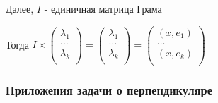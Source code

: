 \documentclass[12pt]{article}
\begin{document}
    \smallvspace

    Далее, $I$ - единичная матрица Грама

    \Nota Тогда $I \times \begin{pmatrix}
    \lambda_1\\
    \ldots\\
    \lambda_k \\
    \end{pmatrix} = \begin{pmatrix}
    \lambda_1\\
    \ldots\\
    \lambda_k \\
    \end{pmatrix} = \begin{pmatrix}
    (x,e_1)\\
    \ldots\\
    (x,e_k) \\
    \end{pmatrix}$

    \subsubsection{Приложения задачи о перпендикуляре}
\end{document}
